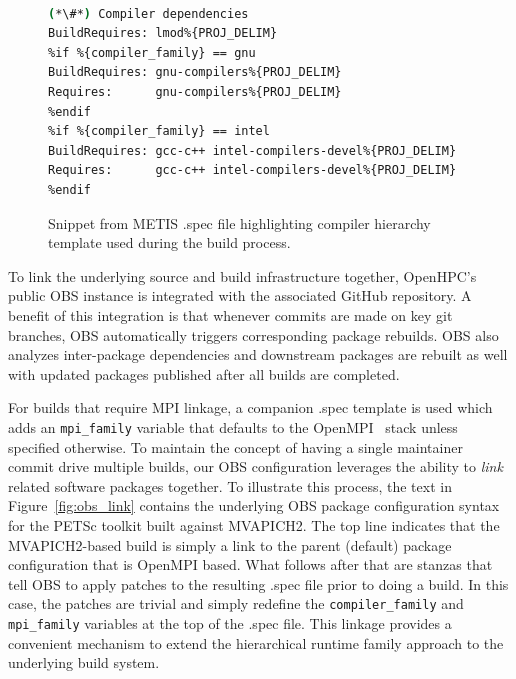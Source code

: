 \documentclass{sig-alternate-05-2015}
\begin{document}
\begin{figure}[h]
\begin{lstlisting}[language=bash,keywords={},basicstyle=\fontsize{7.8}{10}\ttfamily,keepspaces]
%{!?compiler_family: %define compiler_family gnu}

(*\#*) Compiler dependencies
BuildRequires: lmod%{PROJ_DELIM}
%if %{compiler_family} == gnu
BuildRequires: gnu-compilers%{PROJ_DELIM}
Requires:      gnu-compilers%{PROJ_DELIM}
%endif
%if %{compiler_family} == intel
BuildRequires: gcc-c++ intel-compilers-devel%{PROJ_DELIM}
Requires:      gcc-c++ intel-compilers-devel%{PROJ_DELIM}
%endif
\end{lstlisting}
\vspace*{-0.3cm}
  \caption{Snippet from METIS .spec file highlighting compiler hierarchy
    template used during the build process.}
    \label{fig:metis_spec}
\end{figure}

To link the underlying source and build infrastructure together, OpenHPC's public OBS
instance is integrated with the associated GitHub repository. A benefit of
this integration is that whenever commits are made on key git branches,
OBS automatically triggers corresponding package rebuilds. OBS also analyzes
inter-package dependencies and downstream packages are rebuilt as well with
updated packages published after all builds are completed.

For builds that require MPI linkage, a companion .spec template is used which
adds an \texttt{mpi\_family} variable that defaults to the
OpenMPI~\cite{gabriel04:openmpi} stack unless specified otherwise.  To
maintain the concept of having a single maintainer commit drive multiple
builds, our OBS configuration leverages the ability to {\em link} related software
packages together. To illustrate this process, the text in
Figure~\ref{fig:obs_link} contains the underlying
OBS package configuration syntax for the PETSc toolkit built against
MVAPICH2. The top line indicates that the MVAPICH2-based build is simply a link
to the parent (default) package configuration that is OpenMPI based.  What
follows after that are stanzas that tell OBS to apply patches to the resulting
.spec file prior to doing a build. In this case, the patches are trivial and
simply redefine the \texttt{compiler\_family} and \texttt{mpi\_family} variables at
the top of the .spec file.  This linkage provides a convenient mechanism to
extend the hierarchical runtime family approach to the underlying build system.
\end{document}
